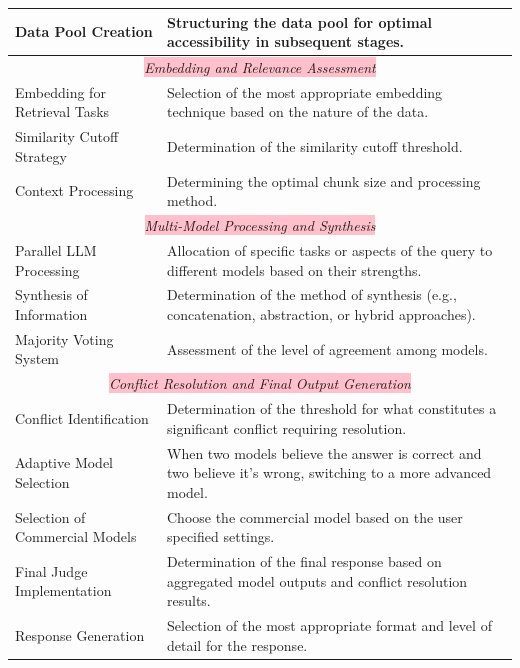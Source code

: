 \begin{table}[ht!]
{\begin{tabular}{lp{11cm}}
            Data Pool Creation & Structuring the data pool for optimal accessibility in subsequent stages. \\
            \hline
            \multicolumn{2}{c}{\colorbox{pink}{\textit{Embedding and Relevance Assessment}}} \\
            Embedding for Retrieval Tasks & Selection of the most appropriate embedding technique based on the nature of the data. \\
            Similarity Cutoff Strategy & Determination of the similarity cutoff threshold. \\
            Context Processing & Determining the optimal chunk size and processing method. \\
            \hline
            \multicolumn{2}{c}{\colorbox{pink}{\textit{Multi-Model Processing and Synthesis}}} \\
            Parallel LLM Processing & Allocation of specific tasks or aspects of the query to different models based on their strengths. \\
            Synthesis of Information & Determination of the method of synthesis (e.g., concatenation, abstraction, or hybrid approaches). \\
            Majority Voting System & Assessment of the level of agreement among models. \\
            \hline
            \multicolumn{2}{c}{\colorbox{pink}{\textit{Conflict Resolution and Final Output Generation}}} \\
            Conflict Identification & Determination of the threshold for what constitutes a significant conflict requiring resolution. \\
            Adaptive Model Selection & When two models believe the answer is correct and two believe it's wrong, switching to a more advanced model. \\
            Selection of Commercial Models & Choose the commercial model based on the user specified settings. \\
            Final Judge Implementation & Determination of the final response based on aggregated model outputs and conflict resolution results. \\
            Response Generation & Selection of the most appropriate format and level of detail for the response. \\
            \bottomrule
        \end{tabular}}
    \label{tab:pipeline-decision-points}
\end{table}

